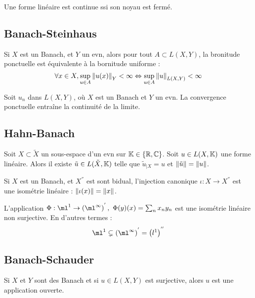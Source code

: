 \documentclass{cours}
\begin{document}
\begin{lemma}
    Une forme linéaire est continue ssi son noyau est fermé.
\end{lemma}

\subsection{Banach-Steinhaus}
\begin{theorem}\label{thm:BanachSteinhaus}
    Si $X$ est un Banach, et $Y$ un evn, alors pour tout $A \subset L(X, Y)$, la bronitude ponctuelle est équivalente à la bornitude uniforme :
    \[
        \forall x \in X, \sup_{u \in A} \left\lVert u(x) \right\rVert_{Y} < \infty \Leftrightarrow \sup_{u\in A}\left\lVert u \right\rVert_{L(X, Y)} < \infty
    \]
\end{theorem}
\begin{corollary}
    Soit $u_{n}$ dans $L(X, Y)$, où $X$ est un Banach et $Y$ un evn. La convergence ponctuelle entraîne la continuité de la limite.
\end{corollary}

\subsection{Hahn-Banach}
\begin{theorem}\label{thm:HahnBanach}
    Soit $X \subset \tilde{X}$ un sous-espace d'un evn sur $\mathbb{K} \in \left\{\mathbb{R}, \mathbb{C}\right\}$. Soit $u \in L(X, \mathbb{K})$ une forme linéaire. Alors il existe $\tilde{u} \in L(\tilde{X}, \mathbb{K})$ telle que $\tilde{u}_{\mid X} = u$ et $\left\lVert \tilde{u} \right\rVert = \left\lVert u \right\rVert$.
\end{theorem}

\begin{corollary}
    Si $X$ est un Banach, et $X^{''}$ est sont bidual, l'injection canonique $\iota : X \rightarrow X^{''}$ est une isométrie linéaire : $\left\lVert \iota(x) \right\rVert = \left\lVert x \right\rVert$.
\end{corollary}

\begin{corollary}
    L'application $\Phi : \ml^{1} \to \left(\ml^{\infty}\right)^{'}, \ \Phi(y)(x) = \sum_{n} x_{n}y_{n}$ est une isométrie linéaire non surjective. En d'autres termes :
    \[\ml^{1} \subsetneq \left(\ml^{\infty}\right)^{'} = \left(l^{1}\right)^{''}\]
\end{corollary}

\subsection{Banach-Schauder}
\begin{theorem}\label{thm:BanachSchauder}
    Si $X$ et $Y$ sont des Banach et si $u \in L(X, Y)$ est surjective, alors $u$ est une application ouverte.
\end{theorem}
\end{document}
